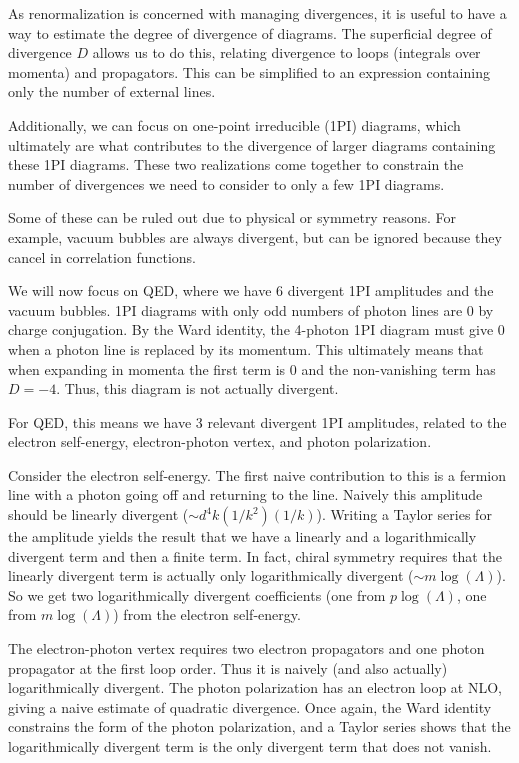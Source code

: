 \documentclass[12pt]{memoir}
\begin{document}
As renormalization is concerned with managing divergences,
it is useful to have a way to estimate the degree of divergence of diagrams.
The superficial degree of divergence $D$ allows us to do this,
relating divergence to loops (integrals over momenta) and propagators.
This can be simplified to an expression containing only the number of external lines.

Additionally, we can focus on one-point irreducible (1PI) diagrams,
which ultimately are what contributes to the divergence of larger diagrams containing these 1PI diagrams.
These two realizations come together to constrain the number of divergences we need to consider
to only a few 1PI diagrams.

Some of these can be ruled out due to physical or symmetry reasons.
For example, vacuum bubbles are always divergent, but can be ignored because they cancel in correlation functions.

We will now focus on QED, where we have 6 divergent 1PI amplitudes and the vacuum bubbles.
1PI diagrams with only odd numbers of photon lines are 0 by charge conjugation.
By the Ward identity, the 4-photon 1PI diagram must give 0 when a photon line is replaced by its momentum.
This ultimately means that when expanding in momenta the first term is 0 and the non-vanishing term has $D=-4$.
Thus, this diagram is not actually divergent.

For QED, this means we have 3 relevant divergent 1PI amplitudes,
related to the electron self-energy, electron-photon vertex, and photon polarization.

Consider the electron self-energy.
The first naive contribution to this is a fermion line with a photon going off and returning to the line.
Naively this amplitude should be linearly divergent ($\sim d^4k (1/k^2) (1/k)$).
Writing a Taylor series for the amplitude yields the result that
we have a linearly and a logarithmically divergent term and then a finite term.
In fact, chiral symmetry requires that the linearly divergent term is actually only logarithmically divergent
($\sim m \log(\Lambda)$).
So we get two logarithmically divergent coefficients (one from $p \log(\Lambda)$, one from $m \log(\Lambda)$)
from the electron self-energy.

The electron-photon vertex requires two electron propagators and one photon propagator at the first loop order.
Thus it is naively (and also actually) logarithmically divergent.
The photon polarization has an electron loop at NLO, giving a naive estimate of quadratic divergence.
Once again, the Ward identity constrains the form of the photon polarization,
and a Taylor series shows that the logarithmically divergent term is the only divergent term that does not vanish.
\end{document}
